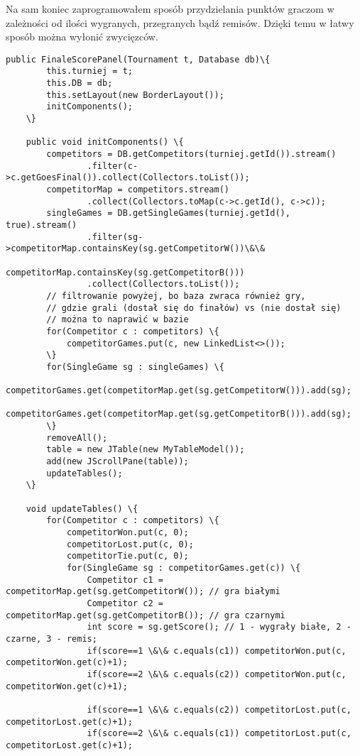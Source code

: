 Na sam koniec zaprogramowałem sposób przydzielania punktów graczom w zależności od ilości wygranych, przegranych bądź remisów. Dzięki temu w łatwy sposób można wyłonić zwycięzców. 
\begin{verbatim}
public FinaleScorePanel(Tournament t, Database db)\{
		this.turniej = t;
		this.DB = db;
		this.setLayout(new BorderLayout());
		initComponents();
	\}
	
	public void initComponents() \{
		competitors = DB.getCompetitors(turniej.getId()).stream()
				.filter(c->c.getGoesFinal()).collect(Collectors.toList());
		competitorMap = competitors.stream()
				.collect(Collectors.toMap(c->c.getId(), c->c));
		singleGames = DB.getSingleGames(turniej.getId(), true).stream()
				.filter(sg->competitorMap.containsKey(sg.getCompetitorW())\&\&
							competitorMap.containsKey(sg.getCompetitorB()))
				.collect(Collectors.toList());
		// filtrowanie powyżej, bo baza zwraca również gry, 
		// gdzie grali (dostał się do finałów) vs (nie dostał się)
		// można to naprawić w bazie
		for(Competitor c : competitors) \{
			competitorGames.put(c, new LinkedList<>());
		\}
		for(SingleGame sg : singleGames) \{
			competitorGames.get(competitorMap.get(sg.getCompetitorW())).add(sg);
			competitorGames.get(competitorMap.get(sg.getCompetitorB())).add(sg);
		\}
		removeAll();
		table = new JTable(new MyTableModel());
		add(new JScrollPane(table));
		updateTables();
	\}	
	
	void updateTables() \{
		for(Competitor c : competitors) \{
			competitorWon.put(c, 0);
			competitorLost.put(c, 0);
			competitorTie.put(c, 0);
			for(SingleGame sg : competitorGames.get(c)) \{
				Competitor c1 = competitorMap.get(sg.getCompetitorW()); // gra białymi
				Competitor c2 = competitorMap.get(sg.getCompetitorB()); // gra czarnymi
				int score = sg.getScore(); // 1 - wygrały białe, 2 - czarne, 3 - remis;
				if(score==1 \&\& c.equals(c1)) competitorWon.put(c, competitorWon.get(c)+1);
				if(score==2 \&\& c.equals(c2)) competitorWon.put(c, competitorWon.get(c)+1);
				
				if(score==1 \&\& c.equals(c2)) competitorLost.put(c, competitorLost.get(c)+1);
				if(score==2 \&\& c.equals(c1)) competitorLost.put(c, competitorLost.get(c)+1);
				

\end{verbatim}
